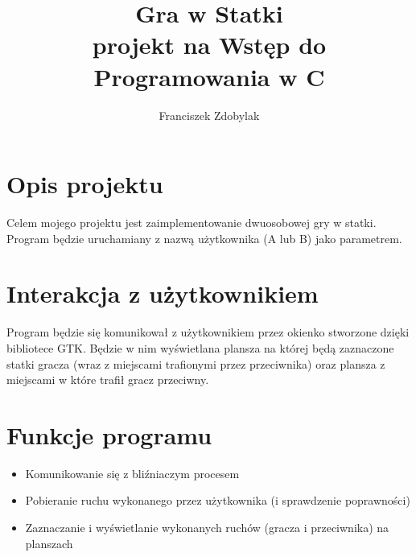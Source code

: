 \documentclass[a4paper]{article}
\author{Franciszek Zdobylak}
\title{\Huge{\bf{Gra w Statki}}\\
				\small projekt na Wstęp do Programowania w C}
\begin{document}
\maketitle

\section{Opis projektu}

Celem mojego projektu jest zaimplementowanie dwuosobowej gry w statki. Program będzie uruchamiany z nazwą użytkownika (A lub B) jako parametrem.

\section{Interakcja z użytkownikiem}
Program będzie się komunikował z użytkownikiem przez okienko stworzone dzięki bibliotece GTK. Będzie w nim wyświetlana plansza na której będą zaznaczone statki gracza
(wraz z miejscami trafionymi przez przeciwnika) oraz plansza z miejscami w które trafił gracz przeciwny.

\section{Funkcje programu}
\begin{itemize}
	\item Komunikowanie się z bliźniaczym procesem
	\item Pobieranie ruchu wykonanego przez użytkownika (i sprawdzenie poprawności)
	\item Zaznaczanie i wyświetlanie wykonanych ruchów (gracza i przeciwnika) na planszach
\end{itemize}
\end{document}
